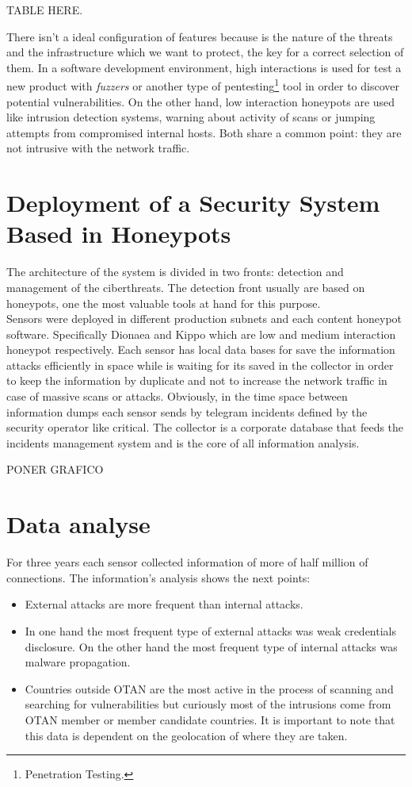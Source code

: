 \documentclass[a4paper]{llncs}
\begin{document}
TABLE HERE.

There isn't a ideal configuration of features because is the nature of the threats and the infrastructure which we want to protect, the key for a correct selection of them. In a software development environment, high interactions is used for test a new product with {\it fuzzers} or another type of pentesting\footnote{Penetration Testing.} tool in order to discover potential vulnerabilities. On the other hand, low interaction honeypots are used like intrusion detection systems, warning about activity of scans or jumping attempts from compromised internal hosts. Both share a common point: they are not intrusive with the network traffic.

\section{Deployment of a Security System Based in Honeypots}
The architecture of the system is divided in two fronts: detection and management of the ciberthreats. The detection front usually are based on honeypots, one the most valuable tools at hand for this purpose.\\

Sensors were deployed in different production subnets and each content honeypot software. Specifically Dionaea\cite{dionaea} and Kippo\cite{kippo} which are low and medium interaction honeypot respectively. Each sensor has local data bases for save the information attacks efficiently in space while is waiting for its saved in the collector in order to keep the information by duplicate and not to increase the network traffic in case of massive scans or attacks. Obviously, in the time space between information dumps each sensor sends by telegram incidents defined by the security operator like critical. The collector is a corporate database that feeds the incidents management system and is the core of all information analysis.

PONER GRAFICO

\section{Data analyse}
For three years each sensor collected information of more of half million of connections. The information's analysis shows the next points:
\begin{itemize}
\item External attacks are more frequent than internal attacks.
\item In one hand the most frequent type of external attacks was weak credentials disclosure. On the other hand the most frequent type of internal attacks was malware propagation.
\item Countries outside OTAN are the most active in the process of scanning and searching for vulnerabilities but curiously most of the intrusions come from OTAN member or member candidate countries. It is important to note that this data is dependent on the geolocation of where they are taken.
\end{itemize}
\end{document}
